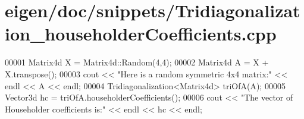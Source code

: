 \hypertarget{eigen_2doc_2snippets_2_tridiagonalization__householder_coefficients_8cpp_source}{}\section{eigen/doc/snippets/\+Tridiagonalization\+\_\+householder\+Coefficients.cpp}
\label{eigen_2doc_2snippets_2_tridiagonalization__householder_coefficients_8cpp_source}

\begin{DoxyCode}
00001 Matrix4d X = Matrix4d::Random(4,4);
00002 Matrix4d A = X + X.transpose();
00003 cout << \textcolor{stringliteral}{"Here is a random symmetric 4x4 matrix:"} << endl << A << endl;
00004 Tridiagonalization<Matrix4d> triOfA(A);
00005 Vector3d hc = triOfA.householderCoefficients();
00006 cout << \textcolor{stringliteral}{"The vector of Householder coefficients is:"} << endl << hc << endl;
\end{DoxyCode}
